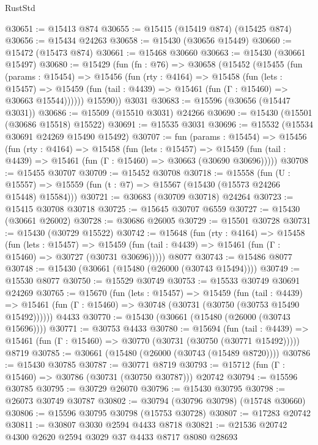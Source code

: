 \begin{lexlean}{RustStd}
\begin{coremodule}
@30651 := @15413 @874
@30655 := @15415 (@15419 @874) (@15425 @874)
@30656 := @15434 @24263
@30658 := @15430 (@30656 @15449)
@30660 := @15472 (@15473 @874)
@30661 := @15468 @30660
@30663 := @15430 (@30661 @15497)
@30680 := @15429
    (fun (fn : @76) =>
    @30658
      (@15452
        (@15455
          (fun (params : @15454) =>
          @15456
            (fun (rty : @4164) =>
            @15458
              (fun (lets : @15457) =>
              @15459 (fun (tail : @4439) => @15461 (fun (Γ : @15460) => @30663 @15544))))))
        @15590))
    @3031
@30683 := @15596 (@30656 (@15447 @3031))
@30686 := @15509 (@15510 @3031) @24266
@30690 := @15430 (@15501 (@30686 @15518) @15522)
@30691 := @15535 @3031
@30696 := @15532 (@15534 @30691 @24269 @15490 @15492)
@30707 := fun (params : @15454) =>
  @15456
    (fun (rty : @4164) =>
    @15458
      (fun (lets : @15457) =>
      @15459 (fun (tail : @4439) => @15461 (fun (Γ : @15460) => @30663 (@30690 @30696)))))
@30708 := @15455 @30707
@30709 := @15452 @30708
@30718 := @15558
    (fun (U : @15557) => @15559 (fun (t : @7) => @15567 (@15430 (@15573 @24266 @15448) @15584)))
@30721 := @30683 (@30709 @30718) @24264
@30723 := @15415 @30708 @30718
@30725 := @15645 @30707 @6559
@30727 := @15430 (@30661 @26002)
@30728 := @30686 @26005
@30729 := @15501 @30728
@30731 := @15430 (@30729 @15522)
@30742 := @15648
    (fun (rty : @4164) =>
    @15458
      (fun (lets : @15457) =>
      @15459 (fun (tail : @4439) => @15461 (fun (Γ : @15460) => @30727 (@30731 @30696)))))
    @8077
@30743 := @15486 @8077
@30748 := @15430 (@30661 (@15480 (@26000 (@30743 @15494))))
@30749 := @15530 @8077
@30750 := @15529 @30749
@30753 := @15533 @30749 @30691 @24269
@30765 := @15670
    (fun (lets : @15457) =>
    @15459
      (fun (tail : @4439) =>
      @15461 (fun (Γ : @15460) => @30748 (@30731 (@30750 (@30753 @15490 @15492))))))
    @4433
@30770 := @15430 (@30661 (@15480 (@26000 (@30743 @15696))))
@30771 := @30753 @4433
@30780 := @15694
    (fun (tail : @4439) => @15461 (fun (Γ : @15460) => @30770 (@30731 (@30750 (@30771 @15492)))))
    @8719
@30785 := @30661 (@15480 (@26000 (@30743 (@15489 @8720))))
@30786 := @15430 @30785
@30787 := @30771 @8719
@30793 := @15712 (fun (Γ : @15460) => @30786 (@30731 (@30750 @30787))) @20742
@30794 := @15596 @30785
@30795 := @30729 @26070
@30796 := @15430 @30795
@30798 := @26073 @30749 @30787
@30802 := @30794 (@30796 @30798) (@15748 @30660)
@30806 := @15596 @30795 @30798 (@15753 @30728)
@30807 := @17283 @20742
@30811 := @30807 @3030 @2594 @4433 @8718
@30821 := @21536 @20742 @4300 @2620 @2594 @3029 @37 @4433 @8717 @8080 @28693

\end{coremodule}
\end{lexlean}
